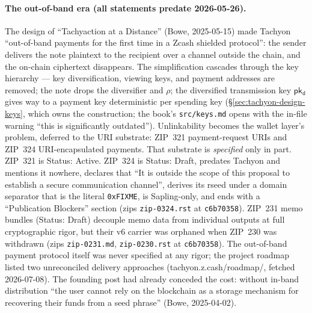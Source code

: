 \documentclass[11pt,a4paper]{article}
\theoremstyle{definition}
\newcommand{\pkd}{\ensuremath{\mathsf{pk_d}}}
\begin{document}
\paragraph{The out-of-band era (all statements predate 2026-05-26).} The
design of ``Tachyaction at a Distance'' (Bowe, 2025-05-15) made Tachyon
``out-of-band payments for the first time in a Zcash shielded protocol'':
the sender delivers the note plaintext to the recipient over a channel
outside the chain, and the on-chain ciphertext disappears. The
simplification cascades through the key hierarchy --- key diversification,
viewing keys, and payment addresses are removed; the note drops the
diversifier and $\rho$; the diversified transmission key $\pkd$ gives way to
a payment key deterministic per spending key
(\S\ref{sec:tachyon-design-keys}, which owns the construction; the book's
\texttt{src/keys.md} opens with the in-file warning ``this is
significantly outdated''). Unlinkability becomes the wallet layer's problem,
deferred to the URI substrate: ZIP~321 payment-request URIs and ZIP~324
URI-encapsulated payments. That substrate is \emph{specified} only in part.
ZIP~321 is Status: Active. ZIP~324 is Status: Draft, predates Tachyon and
mentions it nowhere, declares that ``It is outside the scope of this
proposal to establish a secure communication channel'', derives its
\textsf{rseed} under a domain separator that is the literal
\texttt{0xFIXME}, is Sapling-only, and ends with a ``Publication Blockers''
section (zips \texttt{zip-0324.rst} at \texttt{c6b70358}). ZIP~231 memo
bundles (Status: Draft) decouple memo data from individual outputs at full
cryptographic rigor, but their v6 carrier was orphaned when ZIP~230 was
withdrawn (zips \texttt{zip-0231.md}, \texttt{zip-0230.rst} at
\texttt{c6b70358}). The out-of-band payment protocol itself was never
specified at any rigor; the project roadmap listed two unreconciled delivery
approaches (tachyon.z.cash/roadmap/, fetched 2026-07-08). The founding post
had already conceded the cost: without in-band distribution ``the user
cannot rely on the blockchain as a storage mechanism for recovering their
funds from a seed phrase'' (Bowe, 2025-04-02).
\end{document}

